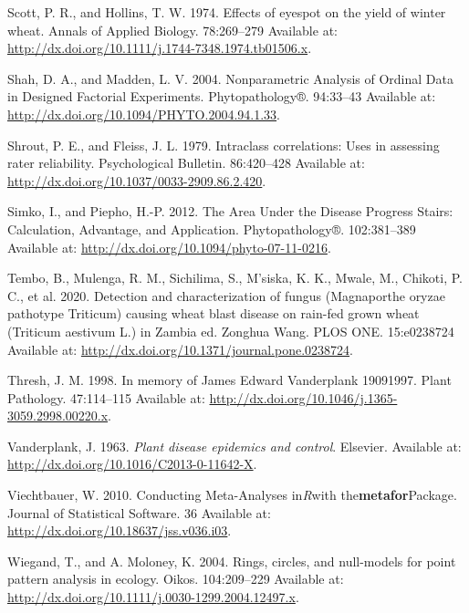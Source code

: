 \documentclass[
  letterpaper,
]{book}
\newlength{\cslhangindent}
\newlength{\cslentryspacingunit} %
\newenvironment{CSLReferences}[2] %
 {%
  \setlength{\parindent}{0pt}
  \ifodd #1
  \let\oldpar\par
  \def\par{\hangindent=\cslhangindent\oldpar}
  \fi
  \setlength{\parskip}{#2\cslentryspacingunit}
 }%
 {}
\begin{document}
\begin{CSLReferences}{0}{0}
\leavevmode{}%
Scott, P. R., and Hollins, T. W. 1974. Effects of eyespot on the yield
of winter wheat. Annals of Applied Biology. 78:269--279 Available at:
\url{http://dx.doi.org/10.1111/j.1744-7348.1974.tb01506.x}.

\leavevmode{}%
Shah, D. A., and Madden, L. V. 2004. Nonparametric Analysis of Ordinal
Data in Designed Factorial Experiments. Phytopathology®. 94:33--43
Available at: \url{http://dx.doi.org/10.1094/PHYTO.2004.94.1.33}.

\leavevmode{}%
Shrout, P. E., and Fleiss, J. L. 1979. Intraclass correlations: Uses in
assessing rater reliability. Psychological Bulletin. 86:420--428
Available at: \url{http://dx.doi.org/10.1037/0033-2909.86.2.420}.

\leavevmode{}%
Simko, I., and Piepho, H.-P. 2012. The Area Under the Disease Progress
Stairs: Calculation, Advantage, and Application. Phytopathology®.
102:381--389 Available at:
\url{http://dx.doi.org/10.1094/phyto-07-11-0216}.

\leavevmode{}%
Tembo, B., Mulenga, R. M., Sichilima, S., M'siska, K. K., Mwale, M.,
Chikoti, P. C., et al. 2020. Detection and characterization of fungus
(Magnaporthe oryzae pathotype Triticum) causing wheat blast disease on
rain-fed grown wheat (Triticum aestivum L.) in Zambia ed. Zonghua Wang.
PLOS ONE. 15:e0238724 Available at:
\url{http://dx.doi.org/10.1371/journal.pone.0238724}.

\leavevmode{}%
Thresh, J. M. 1998. In memory of James Edward Vanderplank
1909{\textendash}1997. Plant Pathology. 47:114--115 Available at:
\url{http://dx.doi.org/10.1046/j.1365-3059.2998.00220.x}.

\leavevmode{}%
Vanderplank, J. 1963. \emph{Plant disease epidemics and control}.
Elsevier. Available at: \url{http://dx.doi.org/10.1016/C2013-0-11642-X}.

\leavevmode{}%
Viechtbauer, W. 2010. Conducting Meta-Analyses in{\emph{R}}with
the{\textbf{metafor}}Package. Journal of Statistical Software. 36
Available at: \url{http://dx.doi.org/10.18637/jss.v036.i03}.

\leavevmode{}%
Wiegand, T., and A. Moloney, K. 2004. Rings, circles, and null-models
for point pattern analysis in ecology. Oikos. 104:209--229 Available at:
\url{http://dx.doi.org/10.1111/j.0030-1299.2004.12497.x}.


\end{CSLReferences}
\end{document}
